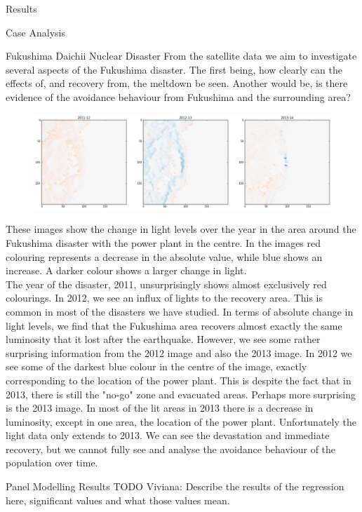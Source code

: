 \documentclass[12pt,fleqn,leqno,letterpaper]{article}
\begin{document}
\begin{section}{Results}
\begin{subsection}{Case Analysis}
\begin{subsubsection}{Fukushima Daichii Nuclear Disaster}
			From the satellite data we aim to investigate several aspects of the Fukushima disaster. The first being, how clearly can the effects of, and recovery from, the meltdown be seen. Another would be, is there evidence of the avoidance behaviour from Fukushima and the surrounding area? 
			\begin{figure}[H]
				\centering
				\includegraphics[width=1\linewidth]{fukushima}\label{fig:fukushima}
			\end{figure}
			These images show the change in light levels over the year in the area around the Fukushima disaster with the power plant in the centre. In the images red colouring represents a decrease in the absolute value, while blue shows an increase. A darker colour shows a larger change in light. \\
			The year of the disaster, 2011, unsurprisingly shows almost exclusively red colourings. In 2012, we see an influx of lights to the recovery area. This is common in most of the disasters we have studied. In terms of absolute change in light levels, we find that the Fukushima area recovers almost exactly the same luminosity that it lost after the earthquake. However, we see some rather surprising information from the 2012 image and also the 2013 image. In 2012 we see some of the darkest blue colour in the centre of the image, exactly corresponding to the location of the power plant. This is despite the fact that in 2013, there is still the "no-go" zone and evacuated areas. Perhaps more surprising is the 2013 image. In most of the lit areas in 2013 there is a decrease in luminosity, except in one area, the location of the power plant.  
			Unfortunately the light data only extends to 2013. We can see the devastation and immediate recovery, but we cannot fully see and analyse the avoidance behaviour of the population over time.  
		\end{subsubsection}
  \end{subsection}
  \begin{subsection}{Panel Modelling Results}
    TODO Viviana: Describe the results of the regression here, significant values and what those values mean.

\end{subsection}
\end{section}
\end{document}
